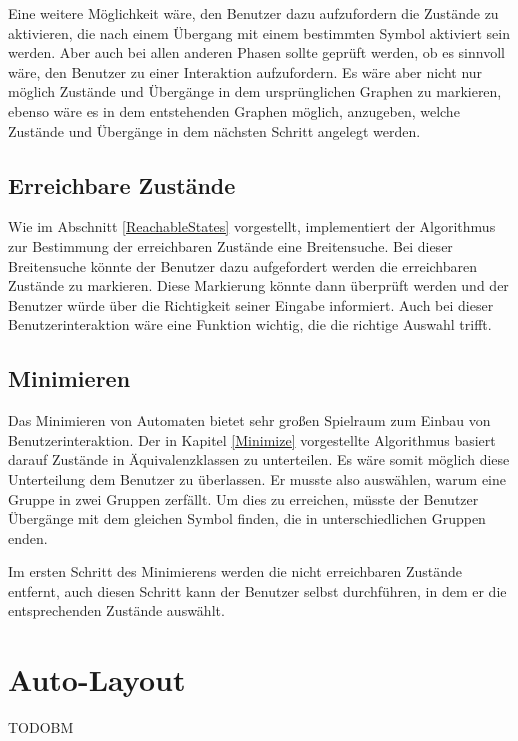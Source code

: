 Eine weitere Möglichkeit wäre, den Benutzer dazu aufzufordern die Zustände zu
aktivieren, die nach einem Übergang mit einem bestimmten Symbol aktiviert sein
werden. Aber auch bei allen anderen Phasen sollte geprüft werden, ob es sinnvoll
wäre, den Benutzer zu einer Interaktion aufzufordern. Es wäre aber nicht nur
möglich Zustände und Übergänge in dem ursprünglichen Graphen zu markieren, ebenso
wäre es in dem entstehenden Graphen möglich, anzugeben, welche Zustände und
Übergänge in dem nächsten Schritt angelegt werden.\vspace{10pt}


\subsection{Erreichbare Zustände}
Wie im Abschnitt \ref{ReachableStates} vorgestellt, implementiert der
Algorithmus zur Bestimmung der erreichbaren Zustände eine Breitensuche. Bei
dieser Breitensuche könnte der Benutzer dazu aufgefordert werden die
erreichbaren Zustände zu markieren. Diese Markierung könnte dann überprüft
werden und der Benutzer würde über die Richtigkeit seiner Eingabe informiert.
Auch bei dieser Benutzerinteraktion wäre eine Funktion wichtig, die die
richtige Auswahl trifft.\vspace{10pt}


\subsection{Minimieren}
Das Minimieren von Automaten bietet sehr großen Spielraum zum Einbau von
Benutzerinteraktion. Der in Kapitel \ref{Minimize} vorgestellte Algorithmus
basiert darauf Zustände in Äquivalenz\-klassen zu unterteilen. Es wäre somit
möglich diese Unterteilung dem Benutzer zu überlassen. Er musste also
auswählen, warum eine Gruppe in zwei Gruppen zerfällt. Um dies zu erreichen,
müsste der Benutzer Übergänge mit dem gleichen Symbol finden, die in
unterschiedlichen Gruppen enden.\vspace{10pt}

Im ersten Schritt des Minimierens werden die nicht erreichbaren Zustände
entfernt, auch diesen Schritt kann der Benutzer selbst durchführen, in dem er die
entsprechenden Zustände auswählt.\vspace{10pt}


\section{Auto-Layout}\label{PerspectiveAutoLayout}

TODOBM

